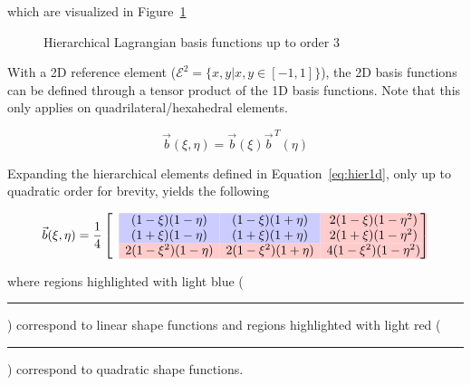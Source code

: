 \documentclass[11pt]{style/memo}
\begin{document}
which are visualized in Figure~\ref{fig:hier1d}

\begin{figure}[h]
    \centering
    \caption{Hierarchical Lagrangian basis functions up to order 3}
    \label{fig:hier1d}
\end{figure}

With a 2D reference element ($\mathcal{E}^2 = \{x,y|x,y\in \left[-1,1\right]\}$), the
2D basis functions can be defined through a tensor product of the 1D basis functions.
Note that this only applies on quadrilateral/hexahedral elements.

\begin{equation}
    \vec{b}(\xi,\eta) = \vec{b}(\xi)\vec{b}^{\, T}(\eta)
\end{equation}

Expanding the hierarchical elements defined in Equation~\ref{eq:hier1d}, only up to
quadratic order for brevity, yields the following

\begin{equation}
    \label{eq:hier2d}
    \vec{b}(\xi,\eta) = \frac{1}{4} \begin{bmatrix}
        & \cellcolor{blue!20!white} (1-\xi)(1-\eta) & \cellcolor{blue!20!white} (1-\xi)(1+\eta) & \cellcolor{red!20!white} 2(1-\xi)(1-\eta^2) \\
        & \cellcolor{blue!20!white} (1+\xi)(1-\eta) & \cellcolor{blue!20!white} (1+\xi)(1+\eta) & \cellcolor{red!20!white} 2(1+\xi)(1-\eta^2) \\
        & \cellcolor{red!20!white} 2(1-\xi^2)(1-\eta) & \cellcolor{red!20!white} 2(1-\xi^2)(1+\eta) & \cellcolor{red!20!white} 4(1-\xi^2)(1-\eta^2)
    \end{bmatrix}
\end{equation}

where regions highlighted with light blue ({\color{blue!20!white}\rule{1em}{1em}})
correspond to linear shape functions and regions highlighted with light red
({\color{red!20!white}\rule{1em}{1em}}) correspond to quadratic shape functions.
\end{document}
